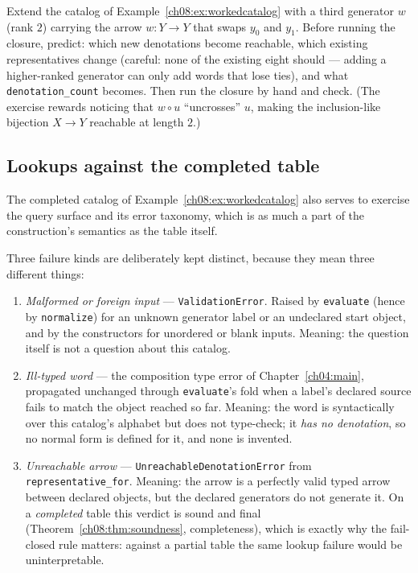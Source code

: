 \begin{exercise}\label{ch08:exercise:third}
Extend the catalog of Example~\ref{ch08:ex:workedcatalog} with a third
generator $w$ (rank $2$) carrying the arrow $w:Y\to Y$ that swaps $y_0$ and
$y_1$. Before running the closure, predict: which new denotations become
reachable, which existing representatives change (careful: none of the
existing eight should --- adding a higher-ranked generator can only add
words that lose ties), and what \texttt{denotation\_count} becomes. Then
run the closure by hand and check. (The exercise rewards noticing that
$w\circ u$ ``uncrosses'' $u$, making the inclusion-like bijection
$X\to Y$ reachable at length $2$.)
\end{exercise}

\subsection{Lookups against the completed table}\label{ch08:sec:lookups}

The completed catalog of Example~\ref{ch08:ex:workedcatalog} also serves to
exercise the query surface and its error taxonomy, which is as much a part
of the construction's semantics as the table itself.

\begin{checkclass}\label{ch08:check:errors}
Three failure kinds are deliberately kept distinct, because they mean three
different things:
\begin{enumerate}
\item \emph{Malformed or foreign input} --- \texttt{ValidationError}. Raised
  by \texttt{evaluate} (hence by \texttt{normalize}) for an unknown
  generator label or an undeclared start object, and by the constructors
  for unordered or blank inputs. Meaning: the question itself is not a
  question about this catalog.
\item \emph{Ill-typed word} --- the composition type error of
  Chapter~\ref{ch04:main}, propagated unchanged through
  \texttt{evaluate}'s fold when a label's declared source fails to match
  the object reached so far. Meaning: the word is syntactically over this
  catalog's alphabet but does not type-check; it \emph{has no denotation},
  so no normal form is defined for it, and none is invented.
\item \emph{Unreachable arrow} --- \texttt{UnreachableDenotationError} from
  \texttt{representative\_for}. Meaning: the arrow is a perfectly valid
  typed arrow between declared objects, but the declared generators do not
  generate it. On a \emph{completed} table this verdict is sound and final
  (Theorem~\ref{ch08:thm:soundness}, completeness), which is exactly why
  the fail-closed rule matters: against a partial table the same lookup
  failure would be uninterpretable.
\end{enumerate}
\end{checkclass}

